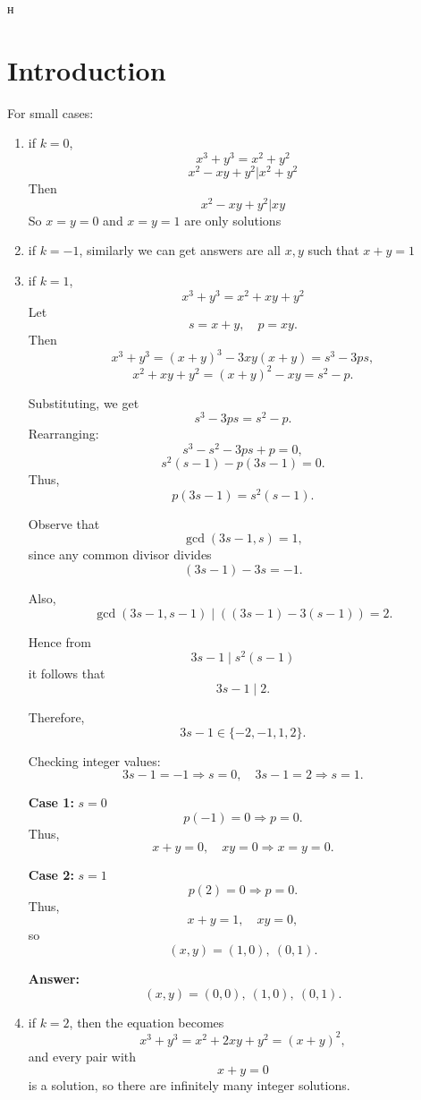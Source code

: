 н\documentclass[a4paper,14pt]{extarticle}  %
\begin{document}
\section{Introduction}
For small cases:
\begin{enumerate}
    \item if $k=0$, $$x^3+y^3=x^2+y^2$$ $$x^2-xy+y^2|x^2+y^2$$ Then $$x^2-xy+y^2|xy$$ So $x=y=0$ and $x=y=1$ are only solutions
    \item if $k=-1$, similarly we can get answers are all $x,y$ such that $x+y=1$ 
    \item if $k=1$, $$x^3+y^3=x^2+xy+y^2$$ Let
\[
s = x + y, \quad p = xy.
\]
Then
\[
x^3 + y^3 = (x+y)^3 - 3xy(x+y) = s^3 - 3ps,
\]
\[
x^2 + xy + y^2 = (x+y)^2 - xy = s^2 - p.
\]

Substituting, we get
\[
s^3 - 3ps = s^2 - p.
\]
Rearranging:
\[
s^3 - s^2 - 3ps + p = 0,
\]
\[
s^2(s - 1) - p(3s - 1) = 0.
\]
Thus,
\[
p(3s - 1) = s^2(s - 1).
\]

Observe that
\[
\gcd(3s - 1, s) = 1,
\]
since any common divisor divides
\[
(3s - 1) - 3s = -1.
\]

Also,
\[
\gcd(3s - 1, s - 1) \mid ((3s - 1) - 3(s - 1)) = 2.
\]

Hence from
\[
3s - 1 \mid s^2(s - 1)
\]
it follows that
\[
3s - 1 \mid 2.
\]

Therefore,
\[
3s - 1 \in \{-2, -1, 1, 2\}.
\]

Checking integer values:
\[
3s - 1 = -1 \Rightarrow s = 0, \quad
3s - 1 = 2 \Rightarrow s = 1.
\]

\textbf{Case 1:} $s = 0$  
\[
p(-1) = 0 \Rightarrow p = 0.
\]
Thus,
\[
x + y = 0, \quad xy = 0 \Rightarrow x = y = 0.
\]

\textbf{Case 2:} $s = 1$  
\[
p(2) = 0 \Rightarrow p = 0.
\]
Thus,
\[
x + y = 1, \quad xy = 0,
\]
so
\[
(x,y) = (1,0), \ (0,1).
\]

\textbf{Answer:}
\[
(x,y) = (0,0), \ (1,0), \ (0,1).
\]
\item
if \(k=2\), then the equation becomes
\[
x^3+y^3=x^2+2xy+y^2=(x+y)^2,
\]
and every pair with
\[
x+y=0
\]
is a solution, so there are infinitely many integer solutions.
\end{enumerate}
\space
\end{document}
